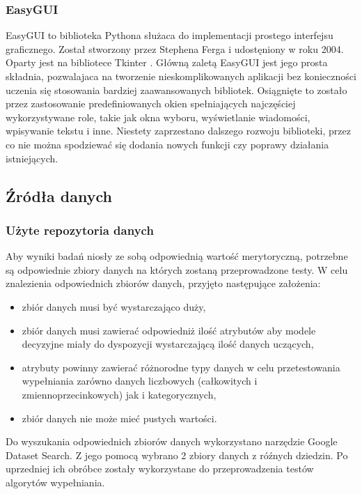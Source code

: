 \documentclass[12pt,twoside]{article}
\begin{document}
\subsubsection{EasyGUI}

EasyGUI to biblioteka Pythona służaca do implementacji prostego interfejsu graficznego.
Został stworzony przez Stephena Ferga i udostęniony w roku 2004. Oparty jest na bibliotece Tkinter \cite{tkinter}.
Główną zaletą EasyGUI jest jego prosta składnia, pozwalajaca na tworzenie nieskomplikowanych aplikacji bez
konieczności uczenia się stosowania bardziej zaawansowanych bibliotek.
Osiągnięte to zostało przez zastosowanie predefiniowanych okien spełniających najczęściej wykorzystywane role,
takie jak okna wyboru, wyświetlanie wiadomości, wpisywanie tekstu i inne.
Niestety zaprzestano dalszego rozwoju biblioteki, przez co nie można spodziewać się dodania nowych funkcji
czy poprawy działania istniejących. \cite{easygui}

\subsection{Źródła danych}

\subsubsection{Użyte repozytoria danych}

Aby wyniki badań niosły ze sobą odpowiednią wartość merytoryczną,
potrzebne są odpowiednie zbiory danych na których zostaną przeprowadzone testy.
W celu znalezienia odpowiednich zbiorów danych, przyjęto następujące założenia:

\begin{itemize}[label=-,labelsep=0.4cm, leftmargin=1.25cm]
    \item zbiór danych musi być wystarczająco duży,
    \item zbiór danych musi zawierać odpowiedniż ilość atrybutów aby modele decyzyjne miały
          do dyspozycji wystarczającą ilość danych uczących,
    \item atrybuty powinny zawierać różnorodne typy danych w celu przetestowania wypełniania zarówno danych
          liczbowych (całkowitych i zmiennoprzecinkowych) jak i kategorycznych,
    \item zbiór danych nie może mieć pustych wartości.
\end{itemize}

Do wyszukania odpowiednich zbiorów danych wykorzystano narzędzie Google Dataset Search. \cite{googlesearch}\cite{googlesearch2}
Z jego pomocą wybrano 2 zbiory danych z róźnych dziedzin.
Po uprzedniej ich obróbce zostały wykorzystane do przeprowadzenia testów algorytów wypełniania.
\end{document}
